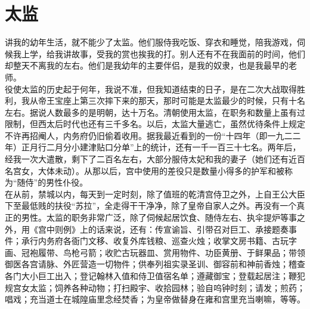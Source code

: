 \fancyhead[RO]{} %
\fancyhead[LE]{} %
\chapter*{太监}
\thispagestyle{empty}
讲我的幼年生活，就不能少了太监。他们服侍我吃饭、穿衣和睡觉，陪我游戏，伺候我上学，给我讲故事，受我的赏也挨我的打。别人还有不在我面前的时间，他们却整天不离我的左右。他们是我幼年的主要伴侣，是我的奴隶，也是我最早的老师。\\

役使太监的历史起于何年，我说不准，但我知道结束的日子，是在二次大战取得胜利，我从帝王宝座上第三次摔下来的那天，那时可能是太监最少的时候，只有十名左右。据说人数最多的是明朝，达十万名。清朝使用太监，在职务和数量上虽有过限制，但西太后时代也还有三千多名。以后，太监大量逃亡，虽然优待条件上规定不许再招阉人，内务府仍旧偷着收用。据我最近看到的一份“十四年（即一九二二年）正月行二月分小建津贴口分单”上的统计，还有一千一百三十七名。两年后，经我一次大遣散，剩下了二百名左右，大部分服侍太妃和我的妻子（她们还有近百名宫女，大体未动）。从那以后，宫中使用的差役只是数量小得多的护军和被称为“随侍”的男性仆役。\\

在从前，禁城以内，每天到一定时刻，除了值班的乾清宫侍卫之外，上自王公大臣下至最低贱的扶役“苏拉”，全走得干干净净，除了皇帝自家人之外。再没有一个真正的男性。太监的职务非常广泛，除了伺候起居饮食、随侍左右、执伞提炉等事之外，用《宫中则例》上的话来说，还有：传宣谕旨、引带召对巨工、承接题奏事件；承行内务府各衙门文移、收复外库钱粮、巡查火烛；收掌文房书籍、古玩字画、冠袍履带、鸟枪弓箭；收贮古玩器皿、赏用物件、功臣黄册、于鲜果品；带领御医各宫请脉、外匠营造一切物件；供奉列祖实录圣训、御容前和神前香烛；稽查各门大小巨工出入；登记翰林入值和侍卫值宿名单；遵藏御宝；登载起居注；鞭犯规宫女太监；饲养各种动物；打扫殿宇、收拾园林；验自呜钟时刻；请发；煎药；唱戏；充当道士在城隍庙里念经焚香；为皇帝做替身在雍和宫里充当喇嘛，等等。\\

